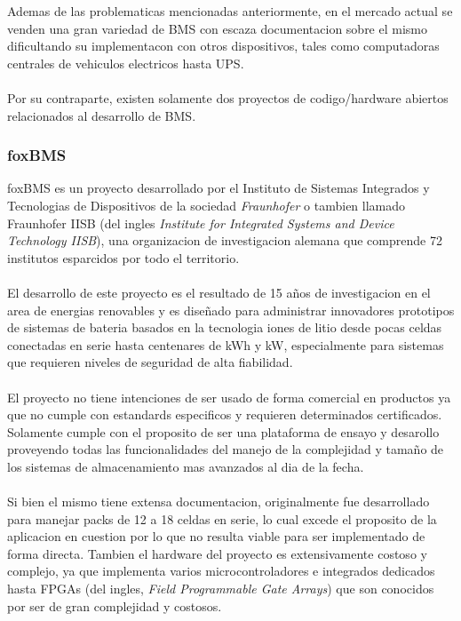 \documentclass[10pt,a4paper]{article}
\begin{document}
    \noindent Ademas de las problematicas mencionadas anteriormente, en el 
    mercado actual se venden una gran variedad de BMS con escaza documentacion  
    sobre el mismo dificultando su implementacon con otros dispositivos, tales
    como computadoras centrales de vehiculos electricos hasta UPS.\\
    \\
    \noindent Por su contraparte, existen solamente dos proyectos de 
    codigo/hardware abiertos relacionados al desarrollo de BMS.

    \subsubsection{foxBMS}

    \noindent foxBMS es un proyecto desarrollado por el Instituto de Sistemas 
    Integrados y Tecnologias de Dispositivos de la sociedad \emph{Fraunhofer} o 
    tambien llamado Fraunhofer IISB (del ingles \emph{Institute for Integrated 
    Systems and Device Technology IISB}), una organizacion de investigacion 
    alemana que comprende 72 institutos esparcidos por todo el territorio.\\
    \\
    \noindent El desarrollo de este proyecto es el resultado de 15 años de 
    investigacion en el area de energias renovables y es diseñado para 
    administrar innovadores prototipos de sistemas de bateria basados en la 
    tecnologia iones de litio desde pocas celdas conectadas en serie hasta 
    centenares de kWh y kW, especialmente para sistemas que requieren niveles 
    de seguridad de alta fiabilidad.\\
    \\
    \noindent El proyecto no tiene intenciones de ser usado de forma comercial 
    en productos ya que no cumple con estandards especificos y requieren
    determinados certificados. Solamente cumple con el proposito de ser una
    plataforma de ensayo y desarollo proveyendo todas las funcionalidades del
    manejo de la complejidad y tamaño de los sistemas de almacenamiento mas
    avanzados al dia de la fecha.\\
    \\
    \noindent Si bien el mismo tiene extensa documentacion, originalmente fue
    desarrollado para manejar packs de 12 a 18 celdas en serie, lo cual excede
    el proposito de la aplicacion en cuestion por lo que no resulta viable para
    ser implementado de forma directa. Tambien el hardware del proyecto es
    extensivamente costoso y complejo, ya que implementa varios 
    microcontroladores e integrados dedicados hasta FPGAs 
    (del ingles, \emph{Field Programmable Gate Arrays}) que son conocidos por 
    ser de gran complejidad y costosos.
\end{document}
